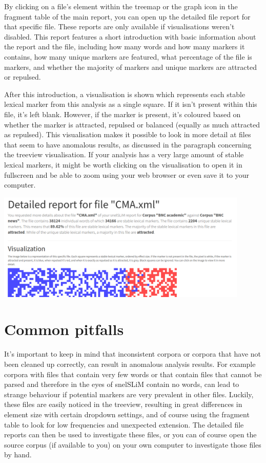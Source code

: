 \documentclass[11pt,a4paper]{article}
\begin{document}
By clicking on a file's element within the treemap or the graph icon in the fragment table of the main report, you can open up the detailed file report for that specific file. These reports are only available if visualisations weren't disabled. This report features a short introduction with basic information about the report and the file, including how many words and how many markers it contains, how many unique markers are featured, what percentage of the file is markers, and whether the majority of markers and unique markers are attracted or repulsed. 

After this introduction, a visualisation is shown which represents each stable lexical marker from this analysis as a single square. If it isn't present within this file, it's left blank. However, if the marker is present, it's coloured based on whether the marker is attracted, repulsed or balanced (equally as much attracted as repulsed). This visualisation makes it possible to look in more detail at files that seem to have anomalous results, as discussed in the paragraph concerning the treeview visualisation. If your analysis has a very large amount of stable lexical markers, it might be worth clicking on the visualisation to open it in fullscreen and be able to zoom using your web browser or even save it to your computer.

\centerline{\includegraphics[width=0.9\textwidth]{images/filereport.png}}

\section{Common pitfalls}

It's important to keep in mind that inconsistent corpora or corpora that have not been cleaned up correctly, can result in anomalous analysis results. For example corpora with files that contain very few words or that contain files that cannot be parsed and therefore in the eyes of snelSLiM contain no words, can lead to strange behaviour if potential markers are very prevalent in other files. Luckily, these files are easily noticed in the treeview, resulting in great differences in element size with certain dropdown settings, and of course using the fragment table to look for low frequencies and unexpected extension. The detailed file reports can then be used to investigate these files, or you can of course open the source corpus (if available to you) on your own computer to investigate those files by hand.
\end{document}
